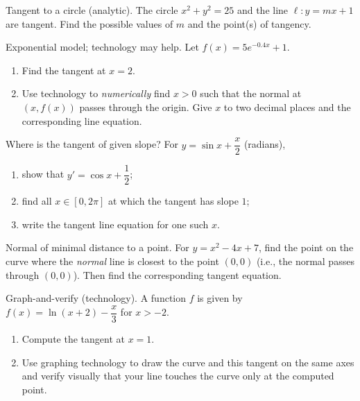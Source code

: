 \documentclass[11pt]{article}
\def\textbf#1{#1}%
\newcounter{question}
\begin{document}
\begin{question}
\textbf{Tangent to a circle (analytic).}
The circle $x^2+y^2=25$ and the line $\ell: y=mx+1$ are tangent. Find the possible values of $m$ and the point(s) of tangency.
\end{question}

\begin{question}
\textbf{Exponential model; technology may help.}
Let $f(x)=5e^{-0.4x}+1$. 
\begin{enumerate}
  \item Find the tangent at $x=2$.
  \item Use technology to \emph{numerically} find $x>0$ such that the normal at $(x,f(x))$ passes through the origin. Give $x$ to two decimal places and the corresponding line equation.
\end{enumerate}
\end{question}

\begin{question}
\textbf{Where is the tangent of given slope?}
For $y=\sin x+\dfrac{x}{2}$ (radians),
\begin{enumerate}
  \item show that $y'= \cos x+\dfrac12$;
  \item find all $x\in[0,2\pi]$ at which the tangent has slope $1$;
  \item write the tangent line equation for one such $x$.
\end{enumerate}
\end{question}

\begin{question}
\textbf{Normal of minimal distance to a point.}
For $y=x^2-4x+7$, find the point on the curve where the \emph{normal} line is closest to the point $(0,0)$ (i.e., the normal passes through $(0,0)$). Then find the corresponding tangent equation.
\end{question}

\begin{question}
\textbf{Graph-and-verify (technology).}
A function $f$ is given by $f(x)=\ln(x+2)-\dfrac{x}{3}$ for $x>-2$.
\begin{enumerate}
  \item Compute the tangent at $x=1$.
  \item Use graphing technology to draw the curve and this tangent on the same axes and verify visually that your line touches the curve only at the computed point.
\end{enumerate}
\end{question}
\end{document}
